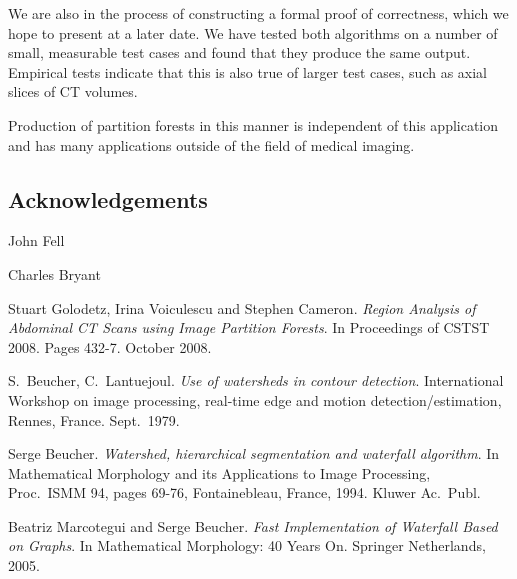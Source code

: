 \documentclass{jfp}
\begin{document}
We are also in the process of constructing a formal proof of
correctness, which we hope to present at a later date. We have tested
both algorithms on a number of small, measurable test cases and found
that they produce the same output. Empirical tests indicate that this
is also true of larger test cases, such as axial slices of CT volumes.

Production of partition forests in this manner is independent of this
application and has many applications outside of the field of medical
imaging.

\subsection{Acknowledgements}

John Fell

Charles Bryant




\begin{thebibliography}{99}

 Stuart Golodetz, Irina Voiculescu
  and Stephen Cameron.  {\em Region Analysis of Abdominal CT Scans
    using Image Partition Forests}. In Proceedings of CSTST
  2008. Pages 432-7. October 2008.

 S.\ Beucher, C.\ Lantuejoul. {\em
  Use of watersheds in contour detection}. International Workshop on
  image processing, real-time edge and motion detection/estimation,
  Rennes, France. Sept.\ 1979.

 Serge Beucher. {\em Watershed,
  hierarchical segmentation and waterfall algorithm}. In Mathematical
  Morphology and its Applications to Image Processing, Proc.\ ISMM 94,
  pages 69-76, Fontainebleau, France, 1994. Kluwer Ac.\ Publ.

 Beatriz Marcotegui and Serge Beucher. {\em Fast
  Implementation of Waterfall Based on Graphs}. In {Mathematical
  Morphology: 40 Years On}. Springer Netherlands, 2005.

\end{thebibliography}
\end{document}

